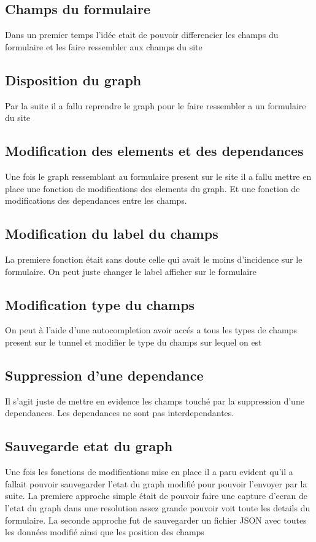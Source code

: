 \subsection{Champs du formulaire}
Dans un premier temps l’idée etait de pouvoir differencier les champs du formulaire et les faire ressembler aux champs du site

\subsection{Disposition du graph}
Par la suite il a fallu reprendre le graph pour le faire ressembler a un formulaire du site

\subsection{Modification des elements et des dependances}
Une fois le graph ressemblant au formulaire present sur le site il a fallu mettre en place une fonction de modifications des elements du graph. Et une fonction de modifications des dependances entre les champs.

\subsection{Modification du label du champs}
La premiere fonction était sans doute celle qui avait le moins d’incidence sur le formulaire. On peut juste changer le label afficher sur le formulaire

\subsection{Modification type du champs}
On peut à l’aide d’une autocompletion avoir accés a tous les types de champs present sur le tunnel et modifier le type du champs sur lequel on est

\subsection{Suppression d’une dependance}
Il s’agit juste de mettre en evidence les champs touché par la suppression d’une dependances. Les dependances ne sont pas interdependantes.

\subsection{Sauvegarde etat du graph}
Une fois les fonctions de modifications mise en place il a paru evident qu’il a fallait pouvoir sauvegarder l’etat du graph modifié pour pouvoir l’envoyer par la suite.
La premiere approche simple était de pouvoir faire une capture d’ecran de l’etat du graph dans une resolution assez grande pouvoir voit toute les details du formulaire.
La seconde approche fut de sauvegarder un fichier JSON avec toutes les données modifié ainsi que les position des champs

